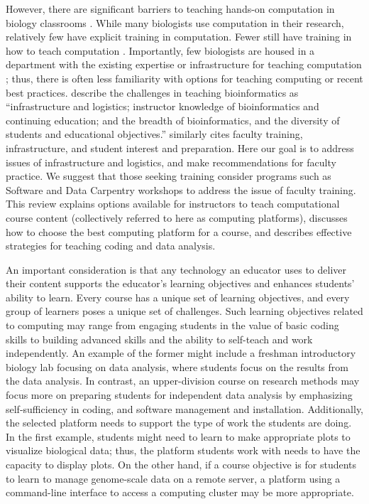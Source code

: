However, there are significant barriers to teaching hands-on computation in biology classrooms \citep{Williams17}.
While many biologists use computation in their research, relatively few have explicit training in computation. 
Fewer still have training in how to teach computation \citep{Williams17}.
Importantly, few biologists are housed in a department with the existing expertise or infrastructure for teaching computation \citep{Williams17};
thus, there is often less familiarity with options for teaching computing or recent best practices. 
\citet{Cummings10} describe the challenges in teaching bioinformatics as 
``infrastructure and logistics; instructor knowledge of bioinformatics and continuing education; and the breadth of bioinformatics, and the diversity of students and educational objectives.''
\citet{Williams17} similarly cites faculty training, infrastructure, and student interest and preparation.
Here our goal is to address issues of infrastructure and logistics,
and make recommendations for faculty practice.
We suggest that those seeking training consider programs such as Software and Data Carpentry workshops
to address the issue of faculty training.
This review explains options available for instructors to teach computational course content
(collectively referred to here as computing platforms),
discusses how to choose the best computing platform for a course, 
and describes effective strategies for teaching coding and data analysis.


An important consideration is that any technology an educator uses to deliver their content supports the educator's learning objectives and enhances students' ability to learn. 
Every course has a unique set of learning objectives, and
every group of learners poses a unique set of challenges. 
Such learning objectives related to computing may range from engaging students in the value of basic coding skills to building advanced skills and the ability to self-teach and work independently.
An example of the former might include a freshman introductory biology lab focusing on data analysis, where students focus on the results from the data analysis. 
In contrast, an upper-division course on research methods may focus more on preparing students for independent data analysis by emphasizing self-sufficiency in coding, and software management and installation.
Additionally, the selected platform needs to support the type of work the students are doing.
In the first example, students might need to learn to make appropriate plots to visualize biological data; thus, the platform students work with needs to have the capacity to display plots.
On the other hand, if a course objective is for students to learn to manage genome-scale data on a remote server, a platform using a command-line interface to access a computing cluster may be more appropriate.


